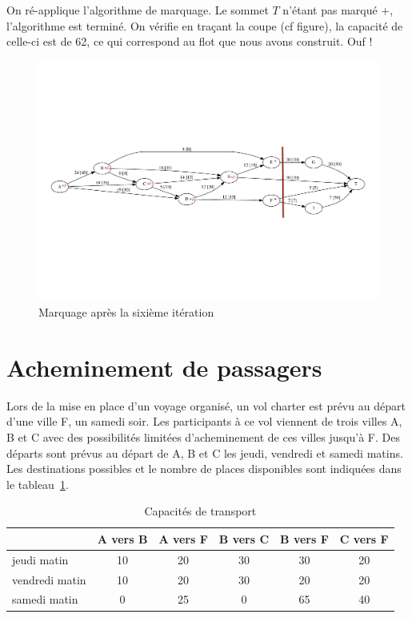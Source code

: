 \documentclass[paper=a4, fontsize=11pt]{scrartcl} %
\numberwithin{equation}{section} %
\numberwithin{figure}{section} %
\numberwithin{table}{section} %
\begin{document}
On ré-applique l'algorithme de marquage. Le sommet $T$ n'étant pas marqué +, l'algorithme est terminé. On vérifie en traçant la coupe (cf figure), la capacité de celle-ci est de 62, ce qui correspond au flot que nous avons construit. Ouf !

\begin{figure}[h]
\begin{center}
	\includegraphics[width=\textwidth]{figs/reseau-6m.pdf}
	\caption{Marquage après la sixième itération}
	\label{fig:res:6m}
\end{center}
\end{figure}


\section{Acheminement de passagers}

Lors de la mise en place d'un voyage organisé, un vol charter est
prévu au départ d'une ville F, un samedi soir. Les participants à ce
vol viennent de trois villes A, B et C avec des possibilités limitées
d'acheminement de ces villes jusqu'à F. Des départs sont prévus au
départ de A, B et C les jeudi, vendredi et samedi matins. Les
destinations possibles et le nombre de places disponibles sont
indiquées dans le tableau~\ref{tab:vol}.

\begin{table}[htbp]
  \begin{center}
    \begin{tabular}{|l|ccccc|}
      \hline
      & A vers B & A vers F & B vers C & B vers F & C vers F \\
     \hline 
      jeudi matin & 10 & 20 & 30 & 30 & 20 \\
      vendredi matin & 10 & 20 & 30 & 20 & 20 \\
      samedi matin & 0 & 25 & 0 & 65 & 40 \\
      \hline
    \end{tabular}
    \caption{Capacités de transport}
    \label{tab:vol}
  \end{center}
\end{table}
\end{document}
